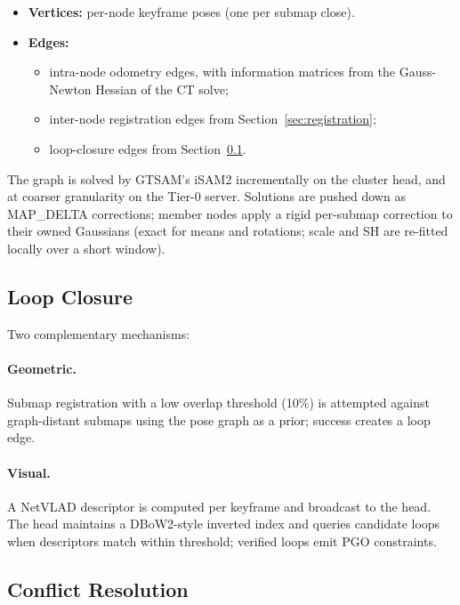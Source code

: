\begin{itemize}
  \item \textbf{Vertices:} per-node keyframe poses (one per submap close).
  \item \textbf{Edges:}
    \begin{itemize}
      \item intra-node odometry edges, with information matrices from the
        Gauss-Newton Hessian of the CT solve;
      \item inter-node registration edges from Section~\ref{sec:registration};
      \item loop-closure edges from Section~\ref{sec:loop}.
    \end{itemize}
\end{itemize}

The graph is solved by GTSAM's iSAM2 incrementally on the cluster head, and at
coarser granularity on the Tier-0 server. Solutions are pushed down as
MAP\_DELTA corrections; member nodes apply a rigid per-submap correction to
their owned Gaussians (exact for means and rotations; scale and SH are
re-fitted locally over a short window).

\subsection{Loop Closure}
\label{sec:loop}

Two complementary mechanisms:

\paragraph{Geometric.} Submap registration with a low overlap threshold (10\%)
is attempted against graph-distant submaps using the pose graph as a prior;
success creates a loop edge.

\paragraph{Visual.} A NetVLAD descriptor is computed per keyframe and
broadcast to the head. The head maintains a DBoW2-style inverted index and
queries candidate loops when descriptors match within threshold; verified
loops emit PGO constraints.

\subsection{Conflict Resolution}
\label{sec:conflict}

